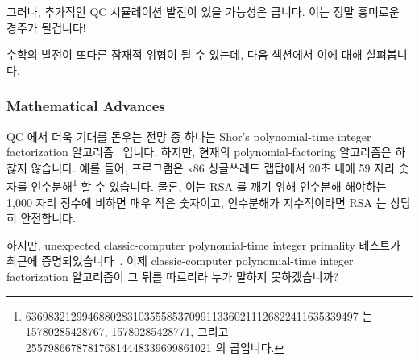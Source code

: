 그러나, 추가적인 QC 시뮬레이션 발전이 있을 가능성은 큽니다.
이는 정말 흥미로운 경주가 될겁니다!

수학의 발전이 또다른 잠재적 위협이 될 수 있는데, 다음 섹션에서 이에 대해
살펴봅니다.

\subsubsection{Mathematical Advances}
\label{sec:future:Mathematical Advances}

QC 에서 더욱 기대를 돋우는 전망 중 하나는 Shor's polynomial-time integer
factorization
알고리즘~\cite{Shor:1997:PAP:264393.264406,WikipediaShorsAlgorithm} 입니다.
하지만, 현재의 polynomial-factoring 알고리즘은 하찮지 않습니다.
예를 들어,  프로그램은 x86 싱글쓰레드 랩탑에서 20초 내에 59 자리
숫자를 인수분해\footnote{
	\scriptsize
	63698321299468802831035558537099113360211126822411635339497 는
	15780285428767, 15780285428771, 그리고
	255798667878176814448339699861021 의 곱입니다.}
할 수 있습니다.
물론, 이는 RSA 를 깨기 위해 인수분해 해야하는 1,000 자리 정수에 비하면 매우
작은 숫자이고, 인수분해가 지수적이라면 RSA 는 상당히 안전합니다.

하지만, unexpected classic-computer polynomial-time integer primality 테스트가
최근에
증명되었습니다~\cite{ManindraAgrawal2004PrimesIsInP,WikipediaAKSPrimalityTest}.
이제 classic-computer polynomial-time integer factorization 알고리즘이 그 뒤를
따르리라 누가 말하지 못하겠습니까?

